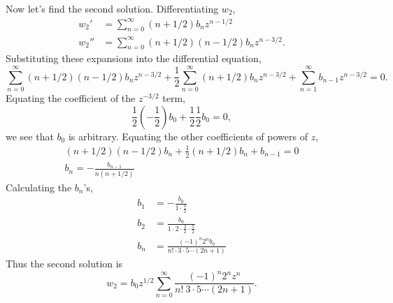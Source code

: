 {\begin{Solution}
  Now let's find the second solution.  Differentiating $w_2$,
  \begin{align*}
    w_2' &= \sum_{n=0}^\infty (n+1/2) b_n z^{n-1/2} \\
    w_2'' &= \sum_{n=0}^\infty (n+1/2)(n-1/2) b_n z^{n-3/2}.
  \end{align*}
  Substituting these expansions into the differential equation,
  \[ \sum_{n=0}^\infty (n+1/2)(n-1/2) b_n z^{n-3/2} + \frac{1}{2} \sum_{n=0}^\infty (n+1/2)b_n
  z^{n-3/2} + \sum_{n=1}^\infty b_{n-1} z^{n-3/2} = 0.\]
  Equating the coefficient of the $z^{-3/2}$ term,
  \[ \frac{1}{2} \left(-\frac{1}{2} \right) b_0 + \frac{1}{2}\frac{1}{2} b_0
  = 0, \]
  we see that $b_0$ is arbitrary.  Equating the other coefficients of powers of
  $z$,
  \begin{gather*}
    (n+1/2)(n-1/2) b_n + \frac{1}{2} (n+1/2)b_n + b_{n-1} = 0 \\
    b_n = - \frac{b_{n-1}}{n(n+1/2)}
  \end{gather*}
  Calculating the $b_n$'s,
  \begin{align*}
    b_1     &= - \frac{b_0}{1\cdot \frac{3}{2}} \\
    b_2     &= \frac{b_0}{1\cdot 2 \cdot \frac{3}{2} \cdot \frac{5}{2}} \\
    b_n     &= \frac{(-1)^n 2^n b_0}{n! \cdot 3 \cdot 5 \cdots (2n+1)}
  \end{align*}
  Thus the second solution is
  \[ \boxed{w_2 = b_0 z^{1/2} \sum_{n=0}^\infty \frac{(-1)^n 2^n z^n}
    {n!\ 3 \cdot 5 \cdots (2n+1)}.} \]
\end{Solution}








}
